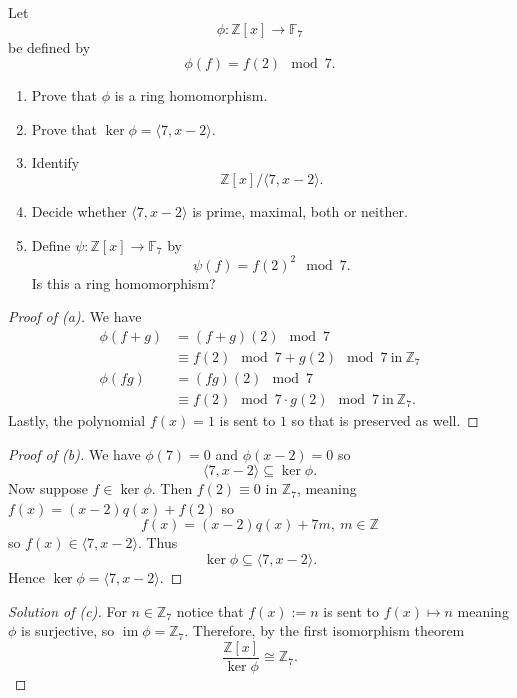 \begin{prob}
    Let 
    \[
        \phi : \mathbb Z[x] \to \mathbb F_7
    \]
    be defined by 
    \[
        \phi(f) = f(2) \mod 7. 
    \]

    \begin{enumerate}[label=\alph*)]
        \item Prove that $\phi$ is a ring homomorphism.  
        \item Prove that $\ker \phi = \langle 7, x-2\rangle$. 
        \item Identify 
            \[
                \mathbb Z[x]/\langle 7, x-2\rangle. 
            \]
        \item Decide whether $\langle 7, x-2\rangle$ is 
            prime, maximal, both or neither. 
        \item Define $\psi: \mathbb Z[x] \to \mathbb F_7$ 
            by 
            \[
                \psi(f) = f(2)^2 \mod 7. 
            \]  
            Is this a ring homomorphism? 
    \end{enumerate}
\end{prob}
\begin{proof}[Proof of (a)]
    We have 
    \begin{align*}
        \phi(f + g) 
        &= (f+g)(2) \mod 7 \\ 
        &\equiv f(2) \mod 7 + g(2) \mod 7 \ \text{in} \ \mathbb Z_7 \\ 
        \phi(fg) 
        &= (fg)(2) \mod 7 \\ 
        &\equiv f(2) \mod 7 \cdot g(2) \mod 7 \ \text{in} \ \mathbb Z_7. 
    \end{align*}
    Lastly, the polynomial $f(x) = 1$ is sent to $1$
    so that is preserved as well. 
\end{proof}
\begin{proof}[Proof of (b)]
    We have $\phi(7) = 0$ and $\phi(x-2) = 0$ so 
    \[
        \langle 7,x-2 \rangle \subseteq \ker \phi. 
    \]
    Now suppose $f \in \ker \phi$. Then 
    $f(2) \equiv 0$ in $\mathbb Z_7$, meaning 
    $f(x) = (x-2)q(x) + f(2)$ so 
    \[
        f(x) = (x-2)q(x) + 7m, \ m \in \mathbb Z
    \]
    so $f(x) \in \langle 7, x-2 \rangle$. 
    Thus 
    \[
        \ker \phi \subseteq \langle 7, x-2 \rangle. 
    \]
    Hence $\ker \phi = \langle 7, x-2 \rangle$. 
\end{proof}
\begin{proof}[Solution of (c)]
    For $n \in \mathbb Z_7$ notice that $f(x) := n$
    is sent to $f(x) \mapsto n$ meaning $\phi$ is 
    surjective, so $\operatorname{im} \phi = \mathbb Z_7$. 
    Therefore, by the first isomorphism theorem 
    \[
        \frac{\mathbb Z[x]}{\ker \phi} 
        \cong \mathbb Z_7.
    \]
\end{proof}
